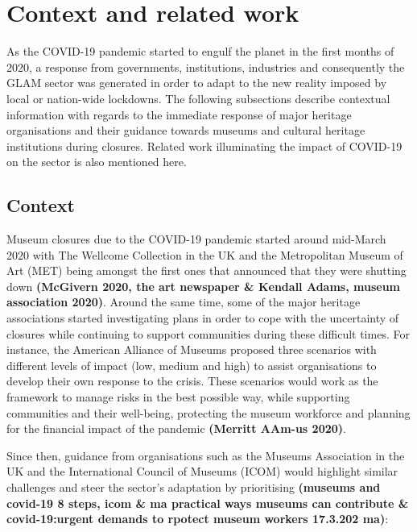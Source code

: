 \documentclass{egpubl}
\begin{document}
\section{Context and related work}
As the COVID-19 pandemic started to engulf the planet in the first months of 2020, a response from governments, institutions, industries and consequently the GLAM sector was generated in order to adapt to the new reality imposed by local or nation-wide lockdowns. The following subsections describe contextual information with regards to the immediate response of major heritage organisations and their guidance towards museums and cultural heritage institutions during closures. Related work illuminating the impact of COVID-19 on the sector is also mentioned here.

\subsection{Context}
Museum closures due to the COVID-19 pandemic started around mid-March 2020 with The Wellcome Collection in the UK and the Metropolitan Museum of Art (MET) being amongst the first ones that announced that they were shutting down \textbf{(McGivern 2020, the art newspaper & Kendall Adams, museum association 2020)}. Around the same time, some of the major heritage  associations started investigating plans in order to cope with the uncertainty of closures while continuing to support communities during these difficult times. For instance, the American Alliance of Museums proposed three scenarios with different levels of impact (low, medium and high) to assist organisations to develop their own response to the crisis. These scenarios would work as the framework to manage risks in the best possible way, while supporting communities and their well-being, protecting the museum workforce and planning for the financial impact of the pandemic \textbf{(Merritt AAm-us 2020)}.

Since then, guidance from organisations such as the Museums Association in the UK and the International Council of Museums (ICOM) would highlight similar challenges and steer the sector's adaptation by prioritising \textbf{(museums and covid-19 8 steps, icom & ma practical ways museums can contribute & covid-19:urgent demands to rpotect museum workers 17.3.202 ma)}:
\end{document}
